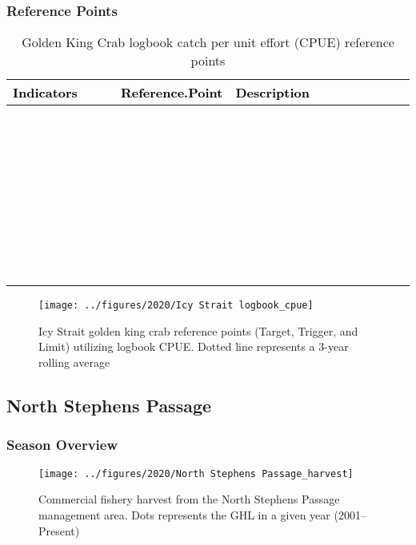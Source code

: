 \documentclass[]{article}
\begin{document}
\subsubsection{Reference Points}\label{reference-points-2}

\begin{table}[!h]

\caption{\label{tab:unnamed-chunk-6}Golden King Crab logbook catch per unit effort (CPUE) reference points}
\centering
\begin{tabular}[t]{l|l|l}
\hline
\textcolor{black}{\textbf{Indicators}} & \textcolor{black}{\textbf{Reference.Point}} & \textcolor{black}{\textbf{Description}}\\
\hline
\rowcolor{gray!6}  \rowcolor{olive}  \textcolor{white}{\textbf{Target Reference Point}} & \textcolor{white}{\textbf{2.2 crab/pot}} & \textcolor{white}{\textbf{Average Commercial Logbook CPUE from 2000-2017}}\\
\hline
\rowcolor{orange}  \textcolor{white}{\textbf{Trigger Reference Point}} & \textcolor{white}{\textbf{1.6 crab/pot}} & \textcolor{white}{\textbf{75\% of the Target Reference Point}}\\
\hline
\rowcolor{gray!6}  \rowcolor{red}  \textcolor{white}{\textbf{Limit Reference Point}} & \textcolor{white}{\textbf{1.1 crab/pot}} & \textcolor{white}{\textbf{50\% of the Target Reference Point}}\\
\hline
\end{tabular}
\end{table}

\begin{figure}[H]
\texttt{[image: ../figures/2020/Icy Strait logbook\_cpue]} \caption{Icy Strait golden king crab reference points (Target, Trigger, and Limit) utilizing logbook CPUE. Dotted line represents a 3-year rolling average}\label{fig:unnamed-chunk-7}
\end{figure}

\subsection{North Stephens Passage}\label{north-stephens-passage}

\subsubsection{Season Overview}\label{season-overview-2}

\begin{figure}[H]
\texttt{[image: ../figures/2020/North Stephens Passage\_harvest]} \caption{Commercial fishery harvest from the North Stephens Passage management area. Dots represents the GHL in a given year (2001–Present)}\label{fig:unnamed-chunk-8}
\end{figure}
\end{document}
